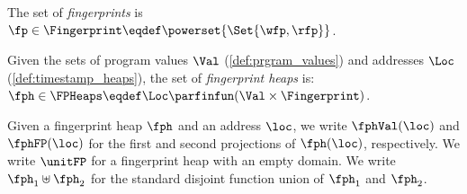 \begin{definition}\label{def:fingerprint_heaps}
The set of \emph{fingerprints} is $\fp \in \Fingerprint \eqdef \powerset{\Set{\wfp,\rfp}}$.

\noindent Given the sets of program values $\Val$ (\ref{def:prgram_values}) and addresses $\Loc$ (\ref{def:timestamp_heaps}), the set of \emph{fingerprint heaps} is: $\fph \in \FPHeaps \eqdef \Loc \parfinfun (\Val \times \Fingerprint)$.
\end{definition}
%
Given a fingerprint heap $\fph$ and an address $\loc$, we write $\fphVal(\loc)$ and $\fphFP(\loc)$ for the first and second projections of $\fph(\loc)$, respectively. We write $\unitFP$ for a fingerprint heap with an empty domain. We write $\fph_1 \uplus \fph_2$ for the standard disjoint function union of $\fph_1$ and $\fph_2$. 

